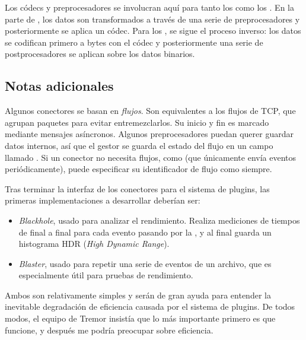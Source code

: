 Los códecs y preprocesadores se involucran aquí para tanto los \sources como los
\sinks. En la parte de \source, los datos son transformados a través de una
serie de preprocesadores y posteriormente se aplica un códec. Para los \sinks,
se sigue el proceso inverso: los datos se codifican primero a bytes con el códec
y posteriormente una serie de postprocesadores se aplican sobre los datos
binarios.

\subsection{Notas adicionales}

Algunos conectores se basan en \emph{flujos}. Son equivalentes a los flujos de
TCP, que agrupan paquetes para evitar entremezclarlos. Su inicio y fin es
marcado mediante mensajes asíncronos. Algunos preprocesadores puedan querer
guardar datos internos, así que el gestor se guarda el estado del flujo en un
campo llamado . Si un conector no necesita flujos, como
 (que únicamente envía eventos periódicamente), puede
especificar su identificador de flujo como  siempre.

Tras terminar la interfaz de los conectores para el sistema de plugins, las
primeras implementaciones a desarrollar deberían ser:

\begin{itemize}
    \item \emph{Blackhole}, usado para analizar el rendimiento. Realiza
        mediciones de tiempos de final a final para cada evento pasando por la
        \pipeline, y al final guarda un histograma HDR (\emph{High Dynamic
        Range}).

    \item \emph{Blaster}, usado para repetir una serie de eventos de un archivo,
        que es especialmente útil para pruebas de rendimiento.

\end{itemize}

Ambos son relativamente simples y serán de gran ayuda para entender la
inevitable degradación de eficiencia causada por el sistema de plugins. De todos
modos, el equipo de Tremor insistía que lo más importante primero es que
funcione, y después me podría preocupar sobre eficiencia.
